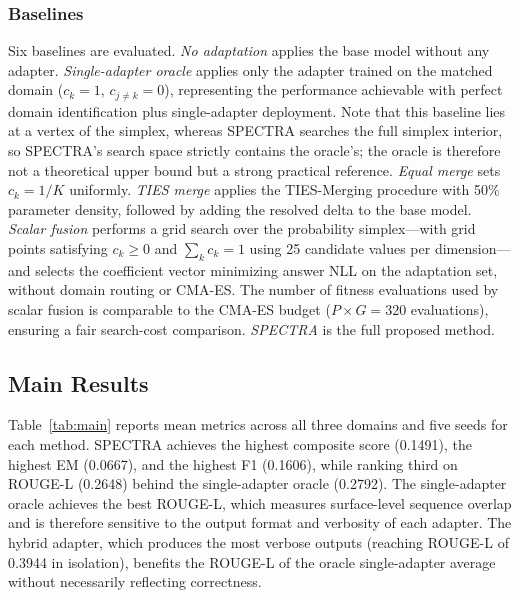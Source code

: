 \documentclass[preprint,12pt]{elsarticle}
\begin{document}
\subsubsection{Baselines}

Six baselines are evaluated. \textit{No adaptation} applies the base model
without any adapter. \textit{Single-adapter oracle} applies only the adapter
trained on the matched domain ($c_k = 1$, $c_{j \neq k} = 0$), representing
the performance achievable with perfect domain identification plus single-adapter
deployment. Note that this baseline lies at a vertex of the simplex, whereas
SPECTRA searches the full simplex interior, so SPECTRA's search space strictly
contains the oracle's; the oracle is therefore not a theoretical upper bound
but a strong practical reference. \textit{Equal merge} sets
$c_k = 1/K$ uniformly. \textit{TIES merge} applies the TIES-Merging
procedure \cite{yadav2023tiesmerging} with 50\% parameter density, followed by
adding the resolved delta to the base model. \textit{Scalar fusion} performs a
grid search over the probability simplex---with grid points satisfying
$c_k \geq 0$ and $\sum_k c_k = 1$ using 25 candidate values per
dimension---and selects the coefficient vector minimizing answer NLL on the
adaptation set, without domain routing or CMA-ES. The number of fitness
evaluations used by scalar fusion is comparable to the CMA-ES budget ($P \times
G = 320$ evaluations), ensuring a fair search-cost comparison.
\textit{SPECTRA} is the full proposed method.

\subsection{Main Results}
\label{subsec:main}

Table~\ref{tab:main} reports mean metrics across all three domains and five
seeds for each method. SPECTRA achieves the highest composite score (0.1491),
the highest EM (0.0667), and the highest F1 (0.1606), while ranking third on
ROUGE-L (0.2648) behind the single-adapter oracle (0.2792). The single-adapter
oracle achieves the best ROUGE-L, which measures surface-level sequence overlap
and is therefore sensitive to the output format and verbosity of each adapter.
The hybrid adapter, which produces the most verbose outputs (reaching ROUGE-L
of 0.3944 in isolation), benefits the ROUGE-L of the oracle single-adapter
average without necessarily reflecting correctness.
\end{document}
